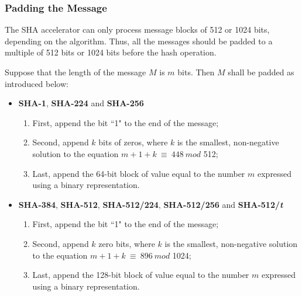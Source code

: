 \documentclass[main\_\_EN.tex]{subfiles}
\begin{document}
\subsubsection{Padding the Message}\label{sec:sha-text-padding}

The SHA accelerator can only process message blocks of 512 or 1024 bits, depending on the algorithm. Thus, all the messages should be padded to a multiple of 512 bits or 1024 bits before the hash operation.

Suppose that the length of the message \begin{math}M\end{math} is \begin{math} m \end{math} bits. Then \begin{math} M \end{math} shall be padded as introduced below:

\begin{itemize}
    \item \textbf{SHA-1}, \textbf{SHA-224} and \textbf{SHA-256}
        \begin{enumerate}
            \item First, append the bit ``1" to the end of the message;
            \item Second, append \begin{math} k \end{math} bits of zeros, where \begin{math} k \end{math} is the smallest, non-negative solution to the equation \begin{math}m + 1 + k \ {\equiv} \ 448 \ mod \end{math} 512;
            \item Last, append the 64-bit block of value equal to the number \begin{math} m \end{math} expressed using a binary representation.
        \end{enumerate}
    \item \textbf{SHA-384}, \textbf{SHA-512}, \textbf{SHA-512/224}, \textbf{SHA-512/256} and \textbf{SHA-512/{\it{t}}}
        \begin{enumerate}
        \item First, append the bit ``1" to the end of the message;
        \item Second, append \begin{math} k \end{math} zero bits, where \begin{math} k \end{math} is the smallest, non-negative solution to the equation \begin{math}m + 1 + k \ {\equiv} \ 896 \ mod \end{math} 1024;
        \item Last, append the 128-bit block of value equal to the number \begin{math} m \end{math} expressed using a binary representation.
        \end{enumerate}
\end{itemize}
\end{document}

